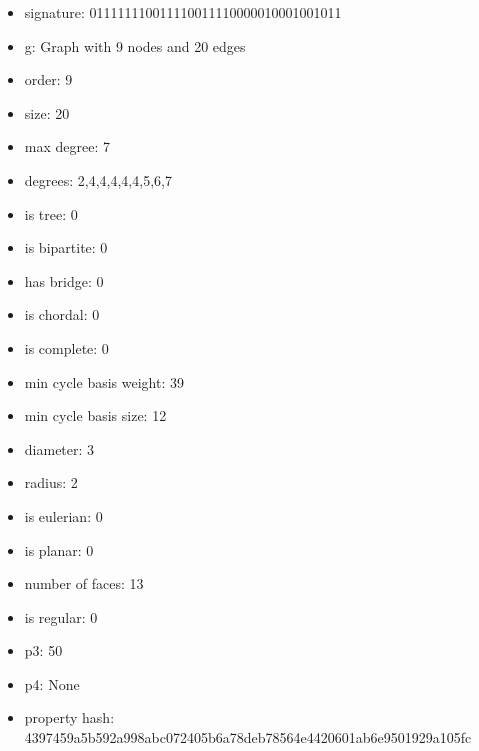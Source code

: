 \newpage
\begin{figure}
\end{figure}
\begin{itemize}
\item signature: 011111110011110011110000010001001011
\item g: Graph with 9 nodes and 20 edges
\item order: 9
\item size: 20
\item max degree: 7
\item degrees: 2,4,4,4,4,4,5,6,7
\item is tree: 0
\item is bipartite: 0
\item has bridge: 0
\item is chordal: 0
\item is complete: 0
\item min cycle basis weight: 39
\item min cycle basis size: 12
\item diameter: 3
\item radius: 2
\item is eulerian: 0
\item is planar: 0
\item number of faces: 13
\item is regular: 0
\item p3: 50
\item p4: None
\item property hash: 4397459a5b592a998abc072405b6a78deb78564e4420601ab6e9501929a105fc
\end{itemize}
